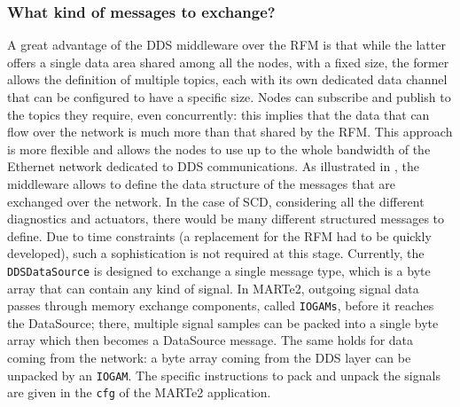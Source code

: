 \subsubsection{What kind of messages to exchange?}
\label{sec:ddsdatasource_messages}
A great advantage of the DDS middleware over the RFM is that while the latter offers a single data area shared among all the nodes, with a fixed size, the former allows the definition of multiple topics, each with its own dedicated data channel that can be configured to have a specific size. Nodes can subscribe and publish to the topics they require, even concurrently: this implies that the data that can flow over the network is much more than that shared by the RFM. This approach is more flexible and allows the nodes to use up to the whole bandwidth of the Ethernet network dedicated to DDS communications. As illustrated in , the middleware allows to define the data structure of the messages that are exchanged over the network. In the case of SCD, considering all the different diagnostics and actuators, there would be many different structured messages to define. Due to time constraints (a replacement for the RFM had to be quickly developed), such a sophistication is not required at this stage. Currently, the \texttt{DDSDataSource} is designed to exchange a single message type, which is a byte array that can contain any kind of signal. In MARTe2, outgoing signal data passes through memory exchange components, called \texttt{IOGAMs}, before it reaches the DataSource; there, multiple signal samples can be packed into a single byte array which then becomes a DataSource message. The same holds for data coming from the network: a byte array coming from the DDS layer can be unpacked by an \texttt{IOGAM}. The specific instructions to pack and unpack the signals are given in the \texttt{cfg} of the MARTe2 application.

